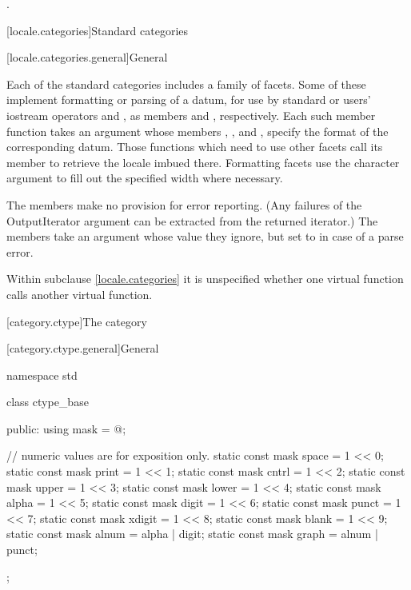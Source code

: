 \begin{itemdescr}
\pnum
\returns
{}.
\end{itemdescr}

[locale.categories]{Standard  categories}

[locale.categories.general]{General}

\pnum
Each of the standard categories includes a family of facets.
Some of these implement formatting or parsing of a datum,
for use by standard or users' iostream operators \tcode{<<} and \tcode{>>},
as members  and , respectively.
Each such member function takes an
%
 argument whose members
%
,
%
,
and
%
,
specify the format of the corresponding datum.
Those functions which need to use other facets call its member 
to retrieve the locale imbued there.
Formatting facets use the character argument 
to fill out the specified width where necessary.

\pnum
The  members make no provision for error reporting.
(Any failures of the OutputIterator argument can be extracted from
the returned iterator.)
The  members take an  argument
whose value they ignore,
but set to  in case of a parse error.

\pnum
Within subclause \ref{locale.categories} it is unspecified whether
one virtual function calls another virtual function.

[category.ctype]{The  category}

[category.ctype.general]{General}

%
\begin{codeblock}
namespace std {
  class ctype_base {
  public:
    using mask = @\seebelow@;

    // numeric values are for exposition only.
    static const mask space  = 1 << 0;
    static const mask print  = 1 << 1;
    static const mask cntrl  = 1 << 2;
    static const mask upper  = 1 << 3;
    static const mask lower  = 1 << 4;
    static const mask alpha  = 1 << 5;
    static const mask digit  = 1 << 6;
    static const mask punct  = 1 << 7;
    static const mask xdigit = 1 << 8;
    static const mask blank  = 1 << 9;
    static const mask alnum  = alpha | digit;
    static const mask graph  = alnum | punct;
  };
}
\end{codeblock}

